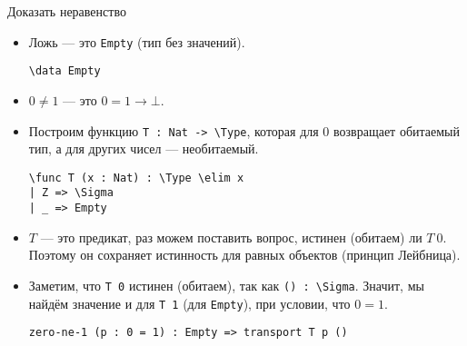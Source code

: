 \documentclass[aspectratio=169,dvipsnames,usenames]{beamer}
\begin{document}
\begin{frame}[fragile]{Доказать неравенство}
\begin{itemize}
\item Ложь --- это \verb!Empty! (тип без значений).
\small\color[HTML]{025002}
\begin{verbatim}
\data Empty
\end{verbatim}\normalsize
\color{black}
\item $0 \ne 1$ --- это $0 = 1 \rightarrow \bot$.
\item Построим функцию \verb!T : Nat -> \Type!, которая для 0 возвращает обитаемый тип, а для других чисел --- необитаемый.
\small\color[HTML]{025002}\begin{verbatim}
\func T (x : Nat) : \Type \elim x
| Z => \Sigma
| _ => Empty
\end{verbatim}\normalsize
\color{black}
\item $T$ --- это предикат, раз можем поставить вопрос, истинен (обитаем) ли $T\ 0$. Поэтому он сохраняет истинность для равных объектов
(принцип Лейбница).
\item Заметим, что \verb!T 0! истинен (обитаем), так как \verb!() : \Sigma!. Значит, мы найдём значение и для \verb!T 1! (для \verb!Empty!), при условии, что $0 = 1$.
\small\color[HTML]{025002}\begin{verbatim}
zero-ne-1 (p : 0 = 1) : Empty => transport T p ()
\end{verbatim}\normalsize
\color{black}
\end{itemize}
\end{frame}
\end{document}
